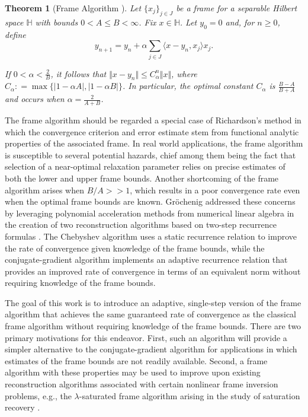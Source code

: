 \documentclass[11pt]{amsart}
\newcounter{Theorem}
\numberwithin{Theorem}{section}
\newtheorem*{theorem*}{Theorem}
\theoremstyle{definition}
\begin{document}
\begin{theorem*}[Frame Algorithm \cite{Grochenig1993}]
Let $\lbrace x_{j} \rbrace_{j\in J}$ be a frame for a separable Hilbert space $\mathbb{H}$ with bounds $0<A\le B<\infty$.  Fix $x\in \mathbb{H}$.  Let $y_{0}=0$ and, for $n\ge 0$, define
\begin{equation} \label{eq:frame-algorithm}
y_{n+1} = y_{n} + \alpha \sum_{j\in J} \langle x-y_{n}, x_{j} \rangle x_{j}. 
\end{equation}

\noindent
If $0<\alpha < \frac{2}{B}$, it follows that $\Vert x- y_{n}\Vert \le C_{\alpha}^{n} \Vert x \Vert$, where $C_{\alpha}: = \max{\lbrace \vert 1-\alpha A\vert, \vert 1-\alpha B\vert \rbrace}$. In particular, the optimal constant $C_{\alpha}$ is $\frac{B-A}{B+A}$ and occurs when $\alpha = \frac{2}{A+B}$.
\end{theorem*}

The frame algorithm should be regarded a special case of Richardson's method \cite{DMYoung1980} in which the convergence criterion and error estimate stem from functional analytic properties of the associated frame.  In real world applications, the frame algorithm is susceptible to several potential hazards, chief among them being the fact that selection of a near-optimal relaxation parameter relies on precise estimates of both the lower and upper frame bounds.  Another shortcoming of the frame algorithm arises when $B/A>>1$, which results in a poor convergence rate even when the optimal frame bounds are known.  Gr\"ochenig addressed these concerns by leveraging polynomial acceleration methods from numerical linear algebra in the creation of two reconstruction algorithms based on two-step recurrence formulas \cite{Grochenig1993}.  The Chebyshev algorithm \cite[Theorem 1]{Grochenig1993} uses a static recurrence relation to improve the rate of convergence given knowledge of the frame bounds, while the conjugate-gradient algorithm \cite[Theorem 2]{Grochenig1993} implements an adaptive recurrence relation that provides an improved rate of convergence in terms of an equivalent norm without requiring knowledge of the frame bounds.

The goal of this work is to introduce an adaptive, single-step version of the frame algorithm that achieves the same guaranteed rate of convergence as the classical frame algorithm without requiring knowledge of the frame bounds.  There are two primary motivations for this endeavor.  First, such an algorithm will provide a simpler alternative to the conjugate-gradient algorithm for applications in which estimates of the frame bounds are not readily available.  Second, a frame algorithm with these properties may be used to improve upon existing reconstruction algorithms associated with certain nonlinear frame inversion problems, e.g., the $\lambda$-saturated frame algorithm arising in the study of saturation recovery \cite{AFGJR2025}. 
\end{document}
